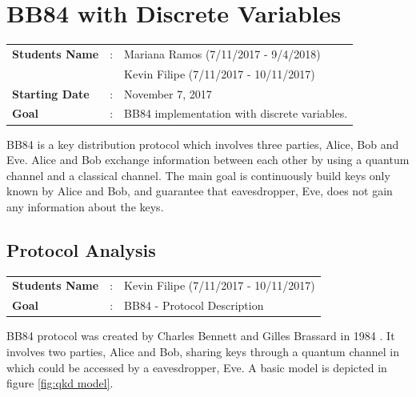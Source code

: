 \clearpage
\section{BB84 with Discrete Variables}

\begin{refsection}

\begin{tcolorbox}	
\begin{tabular}{p{2.75cm} p{0.2cm} p{10.5cm}} 	
\textbf{Students Name}  &:& Mariana Ramos (7/11/2017 - 9/4/2018) \\
                        & & Kevin Filipe (7/11/2017 - 10/11/2017) \\
\textbf{Starting Date} &:& November 7, 2017\\
\textbf{Goal}          &:& BB84 implementation with discrete variables.
\end{tabular}
\end{tcolorbox}

BB84 is a key distribution protocol which involves three parties, Alice, Bob and Eve. Alice and Bob exchange information between each other by using a quantum channel and a classical channel. The main goal is continuously build keys only known by Alice and Bob, and guarantee that eavesdropper, Eve, does not gain any information about the keys.


\subsection{Protocol Analysis}
\begin{tcolorbox}	
	\begin{tabular}{p{2.75cm} p{0.2cm} p{10.5cm}} 	
		\textbf{Students Name}  &:& Kevin Filipe (7/11/2017 - 10/11/2017)\\
		\textbf{Goal}          &:& BB84 - Protocol Description
	\end{tabular}
\end{tcolorbox}

BB84 protocol was created by Charles Bennett and Gilles Brassard in 1984 \cite{Bennet84}. It involves two parties, Alice and Bob, sharing keys through a quantum channel in which could be accessed by a eavesdropper, Eve. A basic model is depicted in figure \ref{fig:qkd model}.


\end{refsection}

